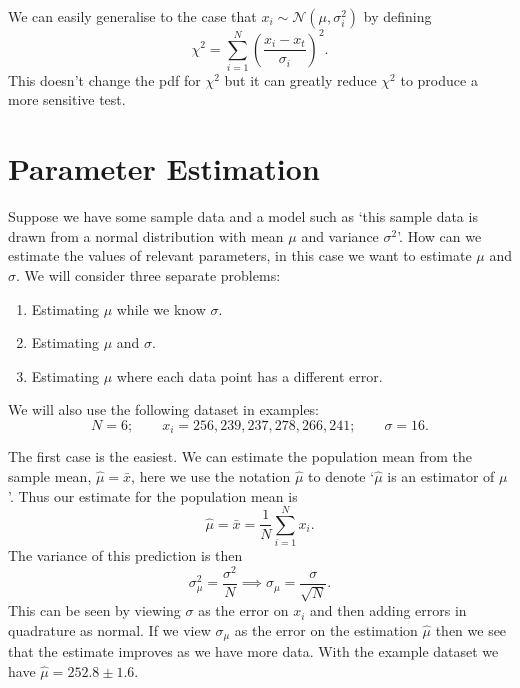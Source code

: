 \documentclass[a4paper]{article}
\newcommand{\distributed}{\sim}
\newcommand{\normal}{\mathcal{N}}
\begin{document}
    We can easily generalise to the case that \(x_i\distributed\normal(\mu, \sigma_i^2)\) by defining
    \[\chi^2 = \sum_{i=1}^{N} \left(\frac{x_i - x_t}{\sigma_i}\right)^2.\]
    This doesn't change the \gls{pdf} for \(\chi^2\) but it can greatly reduce \(\chi^2\) to produce a more sensitive test.
    
    \section{Parameter Estimation}\label{sec:parameter estimation}
    Suppose we have some sample data and a model such as `this sample data is drawn from a normal distribution with mean \(\mu\) and variance \(\sigma^2\)'.
    How can we estimate the values of relevant parameters, in this case we want to estimate \(\mu\) and \(\sigma\).
    We will consider three separate problems:
    \begin{enumerate}
        \item Estimating \(\mu\) while we know \(\sigma\).
        \item Estimating \(\mu\) and \(\sigma\).
        \item Estimating \(\mu\) where each data point has a different error.
    \end{enumerate}
    We will also use the following dataset in examples:
    \[N = 6;\qquad x_i = 256, 239, 237, 278, 266, 241;\qquad \sigma = 16.\]

    The first case is the easiest.
    We can estimate the population mean from the sample mean, \(\hat{\mu} = \bar{x}\), here we use the notation \(\hat{\mu}\) to denote `\(\hat{\mu}\) is an estimator of \(\mu\)'.
    Thus our estimate for the population mean is
    \[\hat{\mu} = \bar{x} = \frac{1}{N}\sum_{i=1}^{N}x_i.\]
    The variance of this prediction is then
    \[\sigma_\mu^2 = \frac{\sigma^2}{N} \implies \sigma_\mu = \frac{\sigma}{\sqrt{N}}.\]
    This can be seen by viewing \(\sigma\) as the error on \(x_i\) and then adding errors in quadrature as normal.
    If we view \(\sigma_\mu\) as the error on the estimation \(\hat{\mu}\) 
    then we see that the estimate improves as we have more data.
    With the example dataset we have \(\hat{\mu} = 252.8\pm 1.6\).
    
\end{document}
